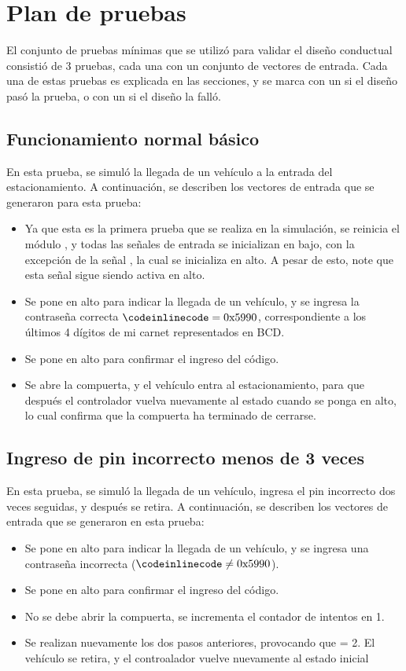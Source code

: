 \section{Plan de pruebas}
El conjunto de pruebas mínimas que se utilizó para validar el diseño conductual consistió de 3 pruebas, cada una con un conjunto de vectores de entrada.
Cada una de estas pruebas es explicada en las secciones, y se marca con un \cmark si el diseño pasó la prueba, o con un \xmark si el diseño la falló.

\subsection{Funcionamiento normal básico \cmark}
En esta prueba, se simuló la llegada de un vehículo a la entrada del estacionamiento. 
A continuación, se describen los vectores de entrada que se generaron para esta prueba:
\begin{itemize}
    \item Ya que esta es la primera prueba que se realiza en la simulación, se reinicia el módulo , y todas las señales de entrada se inicializan en bajo, con la excepción de la señal , la cual se inicializa en alto. A pesar de esto, note que esta señal sigue siendo activa en alto.
    \item Se pone en alto  para indicar la llegada de un vehículo, y se ingresa la contraseña correcta $\code{code} = \text{0x5990}$, correspondiente a los últimos 4 dígitos de mi carnet representados en BCD. 
    \item Se pone en alto  para confirmar el ingreso del código.
    \item Se abre la compuerta, y el vehículo entra al estacionamiento, para que después el controlador vuelva nuevamente al estado  cuando  se ponga en alto, lo cual confirma que la compuerta ha terminado de cerrarse.
\end{itemize}
\subsection{Ingreso de pin incorrecto menos de 3 veces \cmark}
En esta prueba, se simuló la llegada de un vehículo, ingresa el pin incorrecto dos veces seguidas, y después se retira. 
A continuación, se describen los vectores de entrada que se generaron en esta prueba:
\begin{itemize}
    \item Se pone  en alto para indicar la llegada de un vehículo, y se ingresa una contraseña incorrecta ($\code{code} \neq \text{0x5990}$).
    \item Se pone en alto  para confirmar el ingreso del código.
    \item No se debe abrir la compuerta, se incrementa el contador de intentos en 1.
    \item Se realizan nuevamente los dos pasos anteriores, provocando que  = 2. El vehículo se retira, y el controalador vuelve nuevamente al estado inicial 
\end{itemize}
